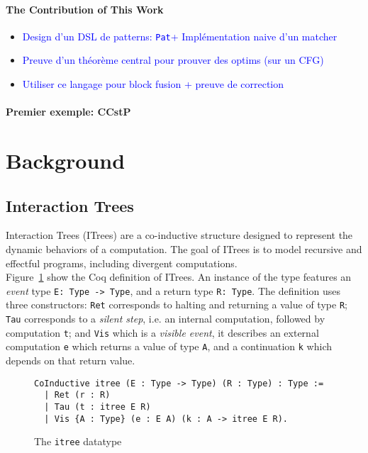 \documentclass[11pt]{article}
\newcommand{\inlinecoq}[1]{\mbox{\lstinline[style=customcoq,columns=fixed,basewidth=.48em]{#1}}}
\newcommand{\ilc}[1]{\inlinecoq{#1}}
\newcommand{\leon}[1]{\textcolor{blue}{#1}}
\newcommand{\pat}{\texttt{Pat}\xspace}
\begin{document}
\paragraph{The Contribution of This Work}

\begin{itemize}
  \item \leon{Design d'un DSL de patterns: \pat + Implémentation naive d'un matcher}
  \item \leon{Preuve d'un théorème central pour prouver des optims (sur un CFG)}
  \item \leon{Utiliser ce langage pour block fusion + preuve de correction}
\end{itemize}
\paragraph{Premier exemple: CCstP}

\section{Background}
\label{sec:background}

\subsection{Interaction Trees}

Interaction Trees (ITrees) are a co-inductive structure designed to represent the dynamic behaviors of a computation. The goal of ITrees is to model recursive and effectful programs, including divergent computations.\\
Figure~\ref{fig:itree} show the Coq definition of ITrees. An instance of the type features an \emph{event} type \ilc{E: Type -> Type}, and a return type \ilc{R: Type}. The definition uses three constructors: \ilc{Ret} corresponds to halting and returning a value of type \ilc{R}; \ilc{Tau} corresponds to a \emph{silent step}, i.e. an internal computation, followed by computation \ilc{t}; and \ilc{Vis} which is a \emph{visible event}, it describes an external computation \ilc{e} which returns a value of type \ilc{A}, and a continuation \ilc{k} which depends on that return value.

\begin{figure}
  \begin{lstlisting}[style=customcoq,basicstyle=\small\ttfamily]
CoInductive itree (E : Type -> Type) (R : Type) : Type :=
  | Ret (r : R)
  | Tau (t : itree E R)
  | Vis {A : Type} (e : E A) (k : A -> itree E R).
  \end{lstlisting}
  \caption{The \ilc{itree} datatype}
  \label{fig:itree}
\end{figure}
\end{document}
